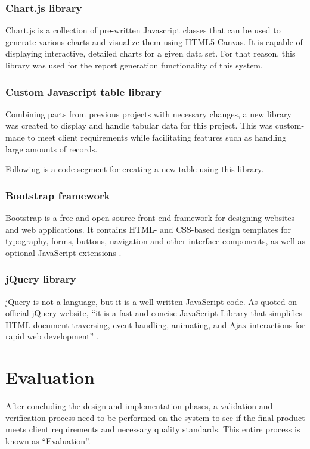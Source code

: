 \documentclass[12pt]{report}
\begin{document}
\subsection{Chart.js library}
Chart.js is a collection of pre-written Javascript classes that can be used to generate various charts and visualize them using HTML5 Canvas. It is capable of displaying interactive, detailed charts for a given data set. For that reason, this library was used for the report generation functionality of this system.

\subsection{Custom Javascript table library}
Combining parts from previous projects with necessary changes, a new library was created to display and handle tabular data for this project. This was custom-made to meet client requirements while facilitating features such as handling large amounts of records.

\noindent
Following is a code segment for creating a new table using this library.




\subsection{Bootstrap framework}
Bootstrap is a free and open-source front-end framework for designing
websites and web applications. It contains HTML- and CSS-based design templates for typography, forms, buttons, navigation and other interface components, as well as optional JavaScript extensions \cite{chahal_2019_bootstrap}.

\subsection{jQuery library}
jQuery is not a language, but it is a well written JavaScript code. As quoted on
official jQuery website, ``it is a fast and concise JavaScript Library that simplifies HTML document traversing, event handling, animating, and Ajax interactions for rapid web development'' \cite{chaffer_2007_jquery}.

\chapter{Evaluation}
After concluding the design and implementation phases, a validation and verification process need to be performed on the system to see if the final product meets client requirements and necessary quality standards. This entire process is known as ``Evaluation''.
\end{document}
